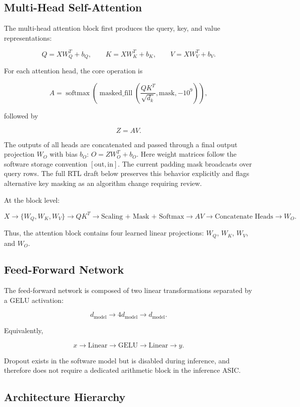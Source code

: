 \documentclass[11pt,a4paper]{article}
\begin{document}
\subsection{Multi-Head Self-Attention}

The multi-head attention block first produces the query, key, and value
representations:

\[
Q=XW_Q^T+b_Q,\qquad K=XW_K^T+b_K,\qquad V=XW_V^T+b_V.
\]

For each attention head, the core operation is

\[
A=
\operatorname{softmax}
\left(
\operatorname{masked\_fill}\left(\frac{QK^T}{\sqrt{d_k}},\mathrm{mask},-10^9\right)
\right),
\]

followed by

\[
Z=AV.
\]

The outputs of all heads are concatenated and passed through a final output
projection $W_O$ with bias $b_O$: $O=ZW_O^T+b_O$. Here weight matrices
follow the software storage convention $[\mathrm{out},\mathrm{in}]$.
The current padding mask broadcasts over query rows. The full RTL draft
below preserves this behavior explicitly and flags alternative key masking
as an algorithm change requiring review.

At the block level:

\[
X
\rightarrow
\{W_Q,W_K,W_V\}
\rightarrow
QK^T
\rightarrow
\text{Scaling + Mask + Softmax}
\rightarrow
AV
\rightarrow
\text{Concatenate Heads}
\rightarrow
W_O.
\]

Thus, the attention block contains four learned linear projections:
$W_Q$, $W_K$, $W_V$, and $W_O$.

\subsection{Feed-Forward Network}

The feed-forward network is composed of two linear transformations separated by
a GELU activation:

\[
d_{\mathrm{model}}
\rightarrow
4d_{\mathrm{model}}
\rightarrow
d_{\mathrm{model}}.
\]

Equivalently,

\[
x
\rightarrow
\text{Linear}
\rightarrow
\text{GELU}
\rightarrow
\text{Linear}
\rightarrow
y.
\]

Dropout exists in the software model but is disabled during inference, and
therefore does not require a dedicated arithmetic block in the inference ASIC.

\subsection{Architecture Hierarchy}
\end{document}
